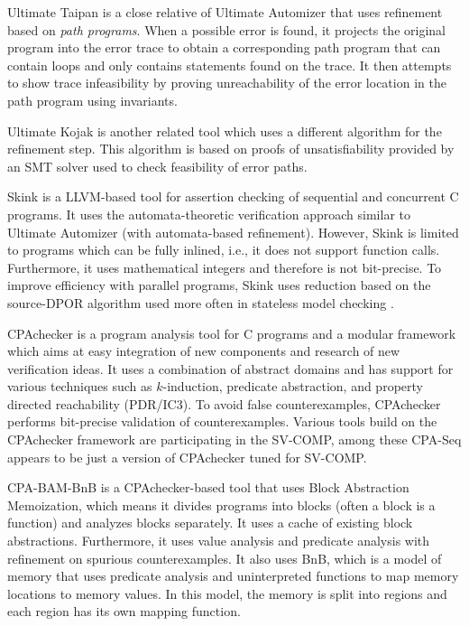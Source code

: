 Ultimate Taipan  is a close relative of Ultimate Automizer that uses refinement based on \emph{path programs}.
When a possible error is found, it projects the original program into the error trace to obtain a corresponding path program that can contain loops and only contains statements found on the trace.
It then attempts to show trace infeasibility by proving unreachability of the error location in the path program using invariants.

Ultimate Kojak  is another related tool which uses a different algorithm for the refinement step.
This algorithm is based on proofs of unsatisfiability provided by an SMT solver used to check feasibility of error paths.

Skink  is a LLVM-based tool for assertion checking of sequential and concurrent C programs.
It uses the automata-theoretic verification approach similar to Ultimate Automizer (with automata-based refinement).
However, Skink is limited to programs which can be fully inlined, i.e., it does not support function calls.
Furthermore, it uses mathematical integers and therefore is not bit-precise.
To improve efficiency with parallel programs, Skink uses reduction based on the source-DPOR algorithm used more often in stateless model checking .

CPAchecker  is a program analysis tool for C programs and a modular framework which aims at easy integration of new components and research of new verification ideas.
It uses a combination of abstract domains and has support for various techniques such as $k$-induction, predicate abstraction, and property directed reachability (PDR/IC3).
To avoid false counterexamples, CPAchecker performs bit-precise validation of counterexamples.
Various tools build on the CPAchecker framework are participating in the SV-COMP, among these CPA-Seq appears to be just a version of CPAchecker tuned for SV-COMP.

CPA-BAM-BnB  is a CPAchecker-based tool that uses Block Abstraction Memoization, which means it divides programs into blocks (often a block is a function) and analyzes blocks separately.
It uses a cache of existing block abstractions.
Furthermore, it uses value analysis and predicate analysis with refinement on spurious counterexamples.
It also uses BnB, which is a model of memory that uses predicate analysis and uninterpreted functions to map memory locations to memory values.
In this model, the memory is split into regions and each region has its own mapping function.

